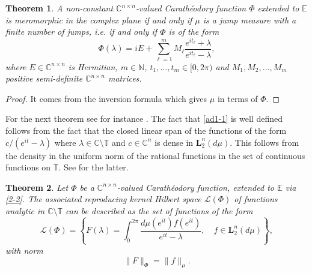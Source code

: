 \documentclass[12pt]{amsart}
\newtheorem{thm}{Theorem}[section]
\theoremstyle{definition}
\theoremstyle{remark}
\numberwithin{equation}{section}
\begin{document}
\begin{thm}
A non-constant $\mathbb C^{n\times n}$-valued Carath\'eodory function $\Phi$ extended to $\mathbb E$ is meromorphic in the complex plane if and only if $\mu$ is a jump measure with a finite number of jumps, i.e. if and only if $\Phi$ is of the form
\begin{equation}
  \label{link}
\Phi(\lambda)=iE+\sum_{\ell=1}^mM_\ell \frac{e^{it_\ell}+\lambda}{e^{it_\ell}-\lambda},
\end{equation}
where $E\in\mathbb C^{n\times n}$ is Hermitian, $m\in\mathbb N$, $t_1,\ldots,t_m\in[0,2\pi)$ and $M_1,M_2,\ldots, M_m$ positive semi-definite $\mathbb C^{n\times n}$ matrices.
  \end{thm}

  \begin{proof}
It comes from the inversion formula which gives $\mu$ in terms of $\Phi$.
    \end{proof}

For the next theorem see for instance \cite[Lemma 6.5 p. 629]{ad1}. The fact that \eqref{ad1-1} is well defined follows from the fact that the closed linear span of the functions
of the form $c/(e^{it}-\lambda)$ where $\lambda\in\mathbb C\setminus\mathbb T$ and $c\in\mathbb C^n$ is dense in $\mathbf L_2^n(d\mu)$. This follows from the density in the
uniform norm of the rational functions in the set of continuous functions on $\mathbb T$. See \cite[Theorem 1 p. 192 and Theorem 2 p. 193]{zbMATH03263403} for the latter.

\begin{thm}
  Let $\Phi$ be a $\mathbb C^{n\times n}$-valued Carath\'eodory function, extended to $\mathbb E$ via \eqref{2-2}. The associated reproducing kernel Hilbert space
  $\mathcal L(\Phi)$ of functions analytic in $\mathbb C\setminus\mathbb T$ can be described as the set of functions of the form
      \begin{equation}
\label{rep-F-phi}
        \mathcal L(\Phi)=\left\{F({\lambda})=\int_0^{2\pi}\frac{d\mu(e^{it})f(e^{it})}{e^{it}-{\lambda}},\quad f\in \mathbf L_2^n(d\mu)\right\},
      \end{equation}
      with norm
      \begin{equation}
\label{ad1-1}
        \|F\|_\Phi=\|f\|_\mu.
        \end{equation}
      \end{thm}
\end{document}
